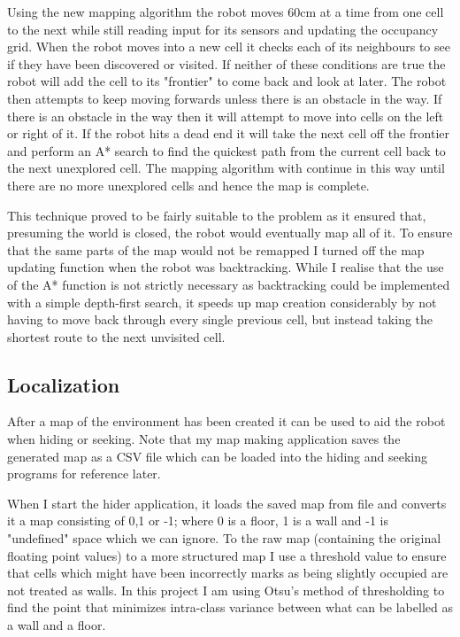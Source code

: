 \documentclass{article}
\begin{document}
Using the new mapping algorithm the robot moves 60cm at a time from one cell to the next while still reading input for its sensors and updating the occupancy grid. When the robot moves into a new cell it checks each of its neighbours to see if they have been discovered or visited. If neither of these conditions are true the robot will add the cell to its "frontier" to come back and look at later. The robot then attempts to keep moving forwards unless there is an obstacle in the way. If there is an obstacle in the way then it will attempt to move into cells on the left or right of it. If the robot hits a dead end it will take the next cell off the frontier and perform an A* search to find the quickest path from the current cell back to the next unexplored cell. The mapping algorithm with continue in this way until there are no more unexplored cells and hence the map is complete.

This technique proved to be fairly suitable to the problem as it ensured that, presuming the world is closed, the robot would eventually map all of it. To ensure that the same parts of the map would not be remapped I turned off the map updating function when the robot was backtracking. While I realise that the use of the A* function is not strictly necessary as backtracking could be implemented with a simple depth-first search, it speeds up map creation considerably by not having to move back through every single previous cell, but instead taking the shortest route to the next unvisited cell.

\subsection{Localization}
After a map of the environment has been created it can be used to aid the robot when hiding or seeking. Note that my map making application saves the generated map as a CSV file which can be loaded into the hiding and seeking programs for reference later.

When I start the hider application, it loads the saved map from file and converts it a map consisting of 0,1 or -1; where 0 is a floor, 1 is a wall and -1 is "undefined" space which we can ignore. To the raw map (containing the original floating point values) to a more structured map I use a threshold value to ensure that cells which might have been incorrectly marks as being slightly occupied are not treated as walls. In this project I am using Otsu's method of thresholding to find the point that minimizes intra-class variance between what can be labelled as a wall and a floor.
\end{document}

